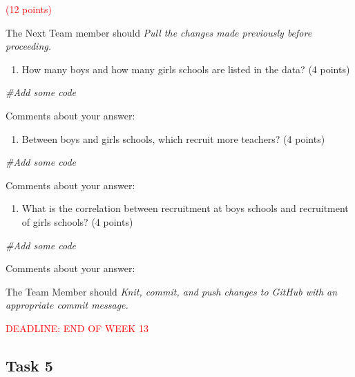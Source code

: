 \documentclass[
]{article}
\newenvironment{Shaded}{\begin{snugshade}}{\end{snugshade}}
\newcommand{\CommentTok}[1]{\textcolor[rgb]{0.56,0.35,0.01}{\textit{#1}}}
\providecommand{\tightlist}{%
  \setlength{\itemsep}{0pt}\setlength{\parskip}{0pt}}
\begin{document}
\textcolor{red}{(12 points)}

The Next Team member should \emph{Pull the changes made previously
before proceeding.}

\begin{enumerate}
\def\labelenumi{(\alph{enumi})}
\tightlist
\item
  How many boys and how many girls schools are listed in the data? (4
  points)
\end{enumerate}

\begin{Shaded}
\begin{Highlighting}[]
\CommentTok{\#Add some code}
\end{Highlighting}
\end{Shaded}

Comments about your answer:

\begin{enumerate}
\def\labelenumi{(\alph{enumi})}
\setcounter{enumi}{1}
\tightlist
\item
  Between boys and girls schools, which recruit more teachers? (4
  points)
\end{enumerate}

\begin{Shaded}
\begin{Highlighting}[]
\CommentTok{\#Add some code}
\end{Highlighting}
\end{Shaded}

Comments about your answer:

\begin{enumerate}
\def\labelenumi{(\alph{enumi})}
\setcounter{enumi}{2}
\tightlist
\item
  What is the correlation between recruitment at boys schools and
  recruitment of girls schools? (4 points)
\end{enumerate}

\begin{Shaded}
\begin{Highlighting}[]
\CommentTok{\#Add some code}
\end{Highlighting}
\end{Shaded}

Comments about your answer:

The Team Member should \emph{Knit, commit, and push changes to GitHub
with an appropriate commit message.}

\textcolor{red}{DEADLINE: END OF WEEK 13}

\hypertarget{task-5}{%
\subsection{Task 5}\label{task-5}}
\end{document}
